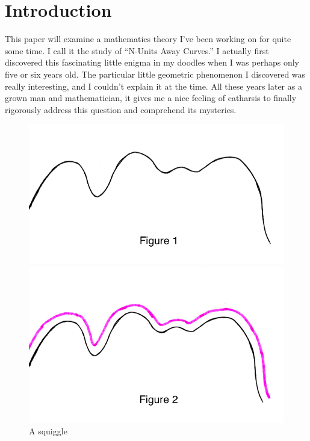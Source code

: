 \section{Introduction}

This paper will examine a mathematics theory I’ve been working on for quite some time. I call it the study of ``N-Units Away Curves.'' I actually first discovered this fascinating little enigma in my doodles when I was perhaps only five or six years old. The particular little geometric phenomenon I discovered was really interesting, and I couldn’t explain it at the time. All these years later as a grown man and mathematician, it gives me a nice feeling of catharsis to finally rigorously address this question and comprehend its mysteries.

\begin{figure}[h!]
  \centering
  \label{intro-1} 
  \begin{minipage}[b]{0.3\linewidth}
    \centering
    \includegraphics[width=.9\linewidth]{intro_img/Fig 1.png} 
    \caption{A squiggle} 
    \label{fig:fig1}
    \vspace{4ex}
  \end{minipage} %
  \begin{minipage}[b]{0.3\linewidth}
    \centering
    \includegraphics[width=.9\linewidth]{intro_img/Fig 2.png} 

\end{minipage}
\end{figure}
